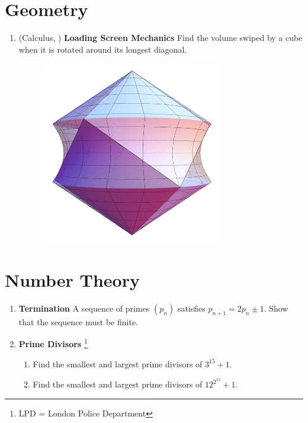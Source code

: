 \documentclass[11pt]{scrartcl}
\begin{document}
\section{Geometry}
\begin{enumerate}[label=\textbf{G\arabic*}.]
    \item (Calculus, \fullchili) \textbf{Loading Screen Mechanics} \newline
    Find the volume swiped by a cube when it is rotated around its longest diagonal.
    \begin{figure}[h]
        \centering
        \includegraphics[width = 8cm]{weekly/week 16/Diagrams/revol.png}
        \hspace{2em}
        \label{fig:revol}
    \end{figure}
\end{enumerate}

\newpage
\section{Number Theory}
\begin{enumerate}[label=\textbf{N\arabic*}.]
    \item \textbf{Termination} \newline
    A sequence of primes $(p_n)$ satisfies $p_{n + 1} = 2p_n \pm 1$. Show that the sequence must be finite.
    
    \item \textbf{Prime Divisors} \footnote{LPD = London Police Department}
    \begin{enumerate}
        \item Find the smallest and largest prime divisors of $3^{15} + 1$.
        \item Find the smallest and largest prime divisors of $12^{2^{15}} + 1$.
    \end{enumerate}
\end{enumerate}
\end{document}
